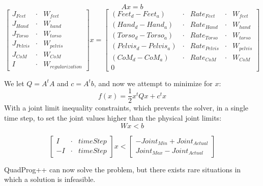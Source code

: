 \documentclass[12pt]{report}
\begin{document}
\begin{equation} 
Ax = b 
\end{equation}
\begin{equation} 
\begin{bmatrix}
J_{Feet} &\cdot & W_{feet} \\
J_{Hand} &\cdot & W_{hand} \\
J_{Torso} &\cdot & W_{torso} \\
J_{Pelvis} &\cdot & W_{pelvis} \\
J_{CoM} &\cdot & W_{CoM} \\
I &\cdot & W_{regularization}
\end{bmatrix}
x = 
\begin{bmatrix}
(Feet_d - Feet_a) &\cdot & {Rate}_{Feet} &\cdot & W_{feet} \\
(Hand_d - Hand_a) &\cdot & {Rate}_{Hand} &\cdot & W_{hand} \\
(Torso_d - Torso_a) &\cdot & {Rate}_{Torso} &\cdot & W_{torso} \\
(Pelvis_d - Pelvis_a) &\cdot & {Rate}_{Pelvis} &\cdot & W_{pelvis} \\
(CoM_d - CoM_a) &\cdot & {Rate}_{CoM} &\cdot & W_{CoM} \\
0
\end{bmatrix}
\end{equation}

We let $Q=A^tA$ and $c=A^tb$, and now we attempt to minimize for $x$:  
\begin{equation} 
f(x) = \frac{1}{2}x^tQx + c^tx 
\end{equation}
With a joint limit inequality constraints, which prevents the solver, in a single time step, to set the joint values higher than the physical joint limits:
\begin{equation} 
Wx<b
\end{equation}

\begin{equation} 
\begin{bmatrix}
I &\cdot & timeStep \\
-I &\cdot & timeStep 
\end{bmatrix}
x
< 
\begin{bmatrix}
-Joint_{Min} + {Joint}_{Actual} \\
Joint_{Max} - {Joint}_{Actual}
\end{bmatrix}
\end{equation}

QuadProg++ can now solve the problem, but there exists rare situations in which a solution is infeasible. 
\end{document}
